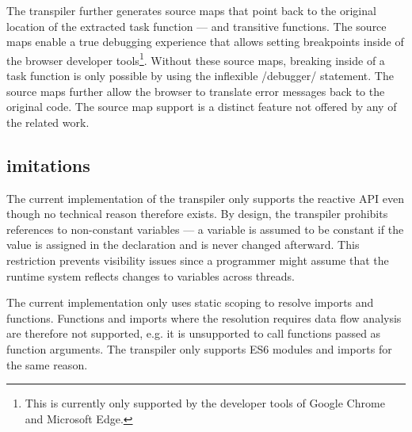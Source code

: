 The transpiler further generates source maps that point back to the original location of the extracted task function --- and transitive functions. The source maps enable a true debugging experience that allows setting breakpoints inside of the browser developer tools\footnote{This is currently only supported by the developer tools of Google Chrome and Microsoft Edge.}. Without these source maps, breaking inside of a task function is only possible by using the inflexible \javascriptinline/debugger/ statement. The source maps further allow the browser to translate error messages back to the original code. The source map support is a distinct feature not offered by any of the related work.

\subsection{imitations}
The current implementation of the transpiler only supports the reactive API even though no technical reason therefore exists.  By design, the transpiler prohibits references to non-constant variables --- a variable is assumed to be constant if the value is assigned in the declaration and is never changed afterward. This restriction prevents visibility issues since a programmer might assume that the runtime system reflects changes to variables across threads. 

The current implementation only uses static scoping to resolve imports and functions. Functions and imports where the resolution requires data flow analysis are therefore not supported, e.g. it is unsupported to call functions passed as function arguments. The transpiler only supports ES6 modules and imports for the same reason.

